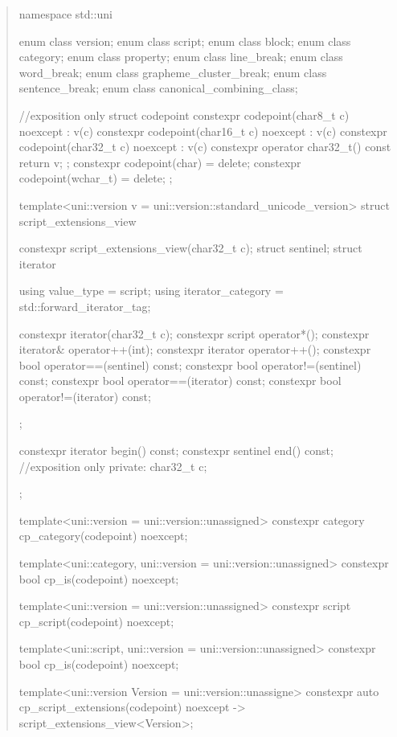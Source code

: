 \documentclass{wg21}
\begin{document}
\begin{quote}
\begin{codeblock}

namespace std::uni {

enum class version;
enum class script;
enum class block;
enum class category;
enum class property;
enum class line_break;
enum class word_break;
enum class grapheme_cluster_break;
enum class sentence_break;
enum class canonical_combining_class;

//exposition only
struct codepoint {
    constexpr codepoint(char8_t c) noexcept : v(c) {}
    constexpr codepoint(char16_t c) noexcept : v(c) {}
    constexpr codepoint(char32_t c) noexcept : v(c) {}
    constexpr operator char32_t() const { return v; };
    constexpr codepoint(char) = delete;
    constexpr codepoint(wchar_t) = delete;
};



template<uni::version v = uni::version::standard_unicode_version>
struct script_extensions_view {
    constexpr script_extensions_view(char32_t c);
    struct sentinel;
    struct iterator {
        using value_type = script;
        using iterator_category = std::forward_iterator_tag;

        constexpr iterator(char32_t c);
        constexpr script operator*();
        constexpr iterator& operator++(int);
        constexpr iterator operator++();
        constexpr bool operator==(sentinel) const;
        constexpr bool operator!=(sentinel) const;
        constexpr bool operator==(iterator) const;
        constexpr bool operator!=(iterator) const;
    };

    constexpr iterator begin() const;
    constexpr sentinel end() const;
    //exposition only
    private:
    char32_t c;
};


template<uni::version = uni::version::unassigned>
constexpr category cp_category(codepoint) noexcept;

template<uni::category, uni::version = uni::version::unassigned>
constexpr bool cp_is(codepoint) noexcept;

template<uni::version = uni::version::unassigned>
constexpr script cp_script(codepoint) noexcept;

template<uni::script, uni::version = uni::version::unassigned>
constexpr bool cp_is(codepoint) noexcept;

template<uni::version Version = uni::version::unassigne>
constexpr auto cp_script_extensions(codepoint) noexcept
    -> script_extensions_view<Version>;

}
\end{codeblock}
\end{quote}
\end{document}
